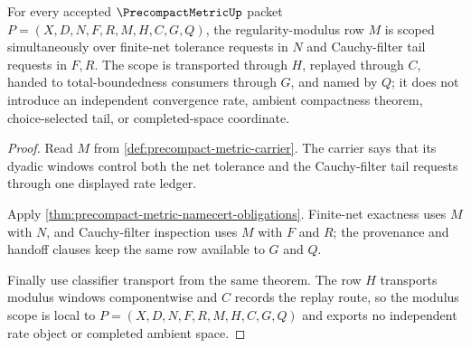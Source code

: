 \begin{theorem}
\label{thm:precompactmetric-regularity-modulus-scope}
For every accepted $\PrecompactMetricUp$ packet $P=(X,D,N,F,R,M,H,C,G,Q)$, the regularity-modulus row $M$ is scoped simultaneously over finite-net tolerance requests in $N$ and Cauchy-filter tail requests in $F,R$. The scope is transported through $H$, replayed through $C$, handed to total-boundedness consumers through $G$, and named by $Q$; it does not introduce an independent convergence rate, ambient compactness theorem, choice-selected tail, or completed-space coordinate.
\end{theorem}
\begin{proof}
Read $M$ from \autoref{def:precompact-metric-carrier}. The carrier says that its dyadic windows control both the net tolerance and the Cauchy-filter tail requests through one displayed rate ledger.

Apply \autoref{thm:precompact-metric-namecert-obligations}. Finite-net exactness uses $M$ with $N$, and Cauchy-filter inspection uses $M$ with $F$ and $R$; the provenance and handoff clauses keep the same row available to $G$ and $Q$.

Finally use classifier transport from the same theorem. The row $H$ transports modulus windows componentwise and $C$ records the replay route, so the modulus scope is local to $P=(X,D,N,F,R,M,H,C,G,Q)$ and exports no independent rate object or completed ambient space.
\end{proof}


